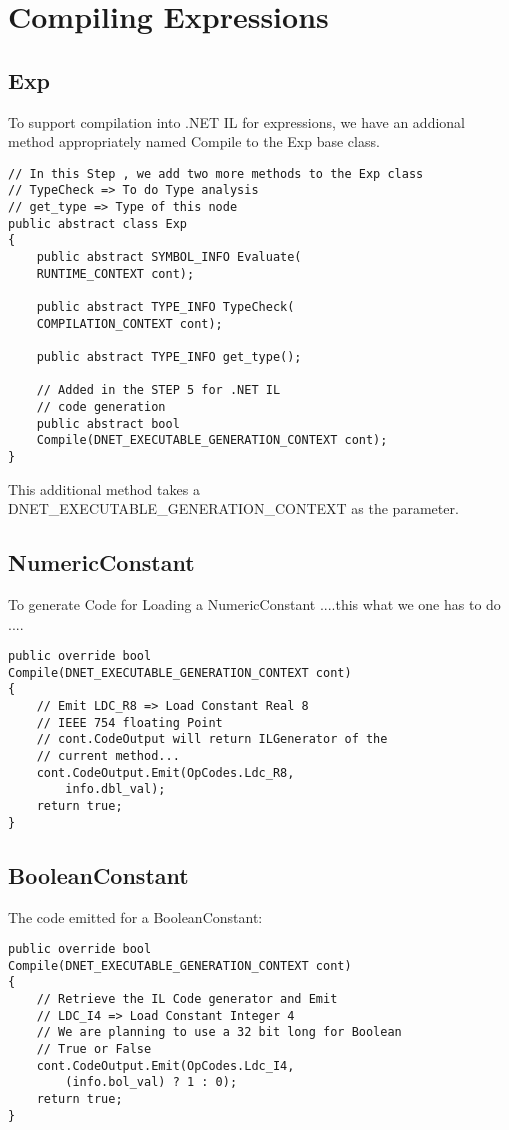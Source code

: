 \section{Compiling Expressions}
\subsection{Exp}
To support compilation into .NET IL for expressions, we have an addional method appropriately named Compile to the Exp base class.

\lstset{style=csharp}
\begin{lstlisting}
// In this Step , we add two more methods to the Exp class
// TypeCheck => To do Type analysis
// get_type => Type of this node
public abstract class Exp
{
	public abstract SYMBOL_INFO Evaluate(
	RUNTIME_CONTEXT cont);
	
	public abstract TYPE_INFO TypeCheck(
	COMPILATION_CONTEXT cont);
	
	public abstract TYPE_INFO get_type();
	
	// Added in the STEP 5 for .NET IL 
	// code generation
	public abstract bool 
	Compile(DNET_EXECUTABLE_GENERATION_CONTEXT cont);
}
\end{lstlisting}
This additional method takes a \\
DNET\_EXECUTABLE\_GENERATION\_CONTEXT as the parameter.
\subsection{NumericConstant}
To generate Code for Loading a NumericConstant ....this what we one has to do ....
\lstset{style=csharp}
\begin{lstlisting}
public override bool 
Compile(DNET_EXECUTABLE_GENERATION_CONTEXT cont)
{
	// Emit LDC_R8 => Load Constant Real 8
	// IEEE 754 floating Point
	// cont.CodeOutput will return ILGenerator of the
	// current method...
	cont.CodeOutput.Emit(OpCodes.Ldc_R8, 
		info.dbl_val);
	return true;
}
\end{lstlisting}
\subsection{BooleanConstant}
The code emitted for a BooleanConstant:

\lstset{style=csharp}
\begin{lstlisting}
public override bool 
Compile(DNET_EXECUTABLE_GENERATION_CONTEXT cont)
{
	// Retrieve the IL Code generator and Emit
	// LDC_I4 => Load Constant Integer 4
	// We are planning to use a 32 bit long for Boolean
	// True or False
	cont.CodeOutput.Emit(OpCodes.Ldc_I4, 
		(info.bol_val) ? 1 : 0);
	return true;
}
\end{lstlisting}

